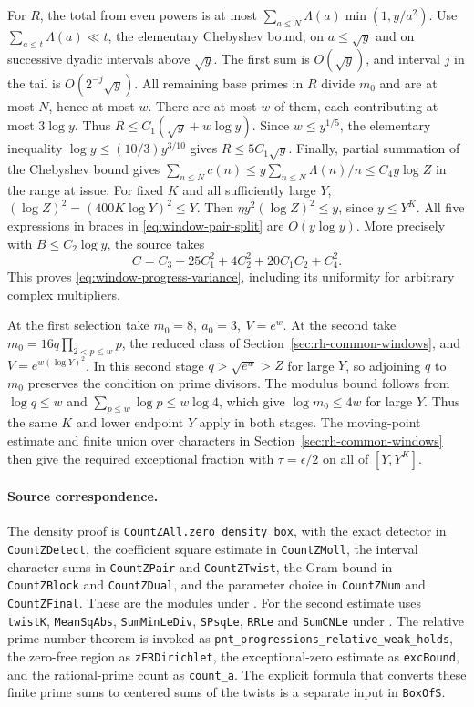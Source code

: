 For \(R\), the total from even powers is at most
\(\sum_{a\le N}\Lambda(a)\min(1,y/a^2)\).
Use \(\sum_{a\le t}\Lambda(a)\ll t\), the elementary Chebyshev
bound, on \(a\le\sqrt y\) and on successive dyadic intervals above
\(\sqrt y\). The first sum is \(O(\sqrt y)\), and interval \(j\)
in the tail is \(O(2^{-j}\sqrt y)\).
All remaining base primes in \(R\) divide \(m_0\) and are at most
\(N\), hence at most \(w\). There are at most \(w\) of them,
each contributing at most \(3\log y\).
Thus \(R\le C_1(\sqrt y+w\log y)\).
Since \(w\le y^{1/5}\), the elementary inequality
\(\log y\le(10/3)y^{3/10}\) gives \(R\le5C_1\sqrt y\).
Finally, partial summation of the Chebyshev bound gives
\(\sum_{n\le N}c(n)\le y\sum_{n\le N}\Lambda(n)/n\le C_4 y\log Z\)
in the range at issue. For fixed \(K\) and all sufficiently large
\(Y\), \((\log Z)^2=(400K\log Y)^2\le Y\).
Then \(\eta y^2(\log Z)^2\le y\), since \(y\le Y^K\).
All five expressions in braces in \eqref{eq:window-pair-split}
are \(O(y\log y)\). More precisely with \(B\le C_2\log y\),
the source takes
\[
 C=C_3+25C_1^2+4C_2^2+20C_1C_2+C_4^2.
\]
This proves \eqref{eq:window-progress-variance}, including its
uniformity for arbitrary complex multipliers.

At the first selection take \(m_0=8,\ a_0=3,\ V=e^w\).
At the second take \(m_0=16q\prod_{2<p\le w}p\), the reduced
class of Section~\ref{sec:rh-common-windows}, and
\(V=e^{w(\log Y)^2}\). In this second stage \(q>\sqrt{e^w}>Z\)
for large \(Y\), so adjoining \(q\) to \(m_0\) preserves the
condition on prime divisors. The modulus bound follows from
\(\log q\le w\) and \(\sum_{p\le w}\log p\le w\log4\),
which give \(\log m_0\le4w\) for large \(Y\).
Thus the same \(K\) and lower endpoint \(Y\) apply in both stages.
The moving-point estimate and finite union over characters in
Section~\ref{sec:rh-common-windows} then give the required
exceptional fraction with \(\tau=\epsilon/2\) on all of
\([Y,Y^K]\).

\paragraph{Source correspondence.}
The density proof is
\texttt{CountZAll.zero\_density\_box}, with the exact detector in
\texttt{CountZDetect}, the coefficient square estimate in
\texttt{CountZMoll}, the interval character sums in
\texttt{CountZPair} and \texttt{CountZTwist}, the Gram bound in
\texttt{CountZBlock} and \texttt{CountZDual}, and the parameter
choice in \texttt{CountZNum} and \texttt{CountZFinal}. These are
the modules under
.
For the second estimate  uses
\texttt{twistK}, \texttt{MeanSqAbs}, \texttt{SumMinLeDiv},
\texttt{SPsqLe}, \texttt{RRLe} and \texttt{SumCNLe} under
.
The relative prime number theorem is invoked as
\texttt{pnt\_progressions\_relative\_weak\_holds}, the zero-free
region as \texttt{zFRDirichlet}, the exceptional-zero estimate as
\texttt{excBound}, and the rational-prime count as
\texttt{count\_a}. The explicit formula that converts these
finite prime sums to centered sums of the twists is a separate
input in \texttt{BoxOfS}.
